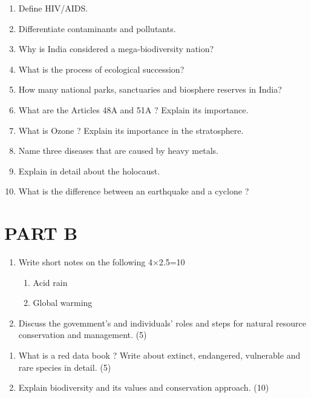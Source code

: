 \documentclass[12pt,a4paper]{article}
\begin{document}
\begin{questions}
    \item \begin{enumerate}[label=(\alph*), leftmargin=2em]
        \item Define HIV/AIDS. 
        \item Differentiate contaminants and pollutants. 
        \item Why is India considered a mega-biodiversity nation?
        \item What is the process of ecological succession?
        \item How many national parks, sanctuaries and biosphere reserves in India?
        \item What are the Articles 48A and 51A ? Explain its importance.  
        \item What is Ozone ? Explain its importance in the stratosphere.
        \item Name three diseases that are caused by heavy metals.
        \item Explain in detail about the holocaust. 
        \item What is the difference between an earthquake and a cyclone ? 
    \end{enumerate}

\vspace{1em}

\section*{\textbf{PART B}}

    \item \begin{enumerate}[label=(\alph*), leftmargin=2em]
        \item Write short notes on the following \hfill 4×2.5=10
    \begin{enumerate}[label=(\roman*), leftmargin=2em]
    \item Acid rain
    \item Global warming 
    \end{enumerate}
        \item Discuss the govemment's and individuals' roles and steps for natural resource conservation and management. \hfill (5)
    \end{enumerate}

    \vspace{\baselineskip}
    
    \item \begin{enumerate}[label=(\alph*), leftmargin=2em]
        \item What is a red data book ? Write about extinct, endangered, vulnerable and rare species in detail. \hfill (5)
        \item Explain biodiversity and its values and conservation approach. \hfill (10)
    \end{enumerate}


\end{questions}
\end{document}
